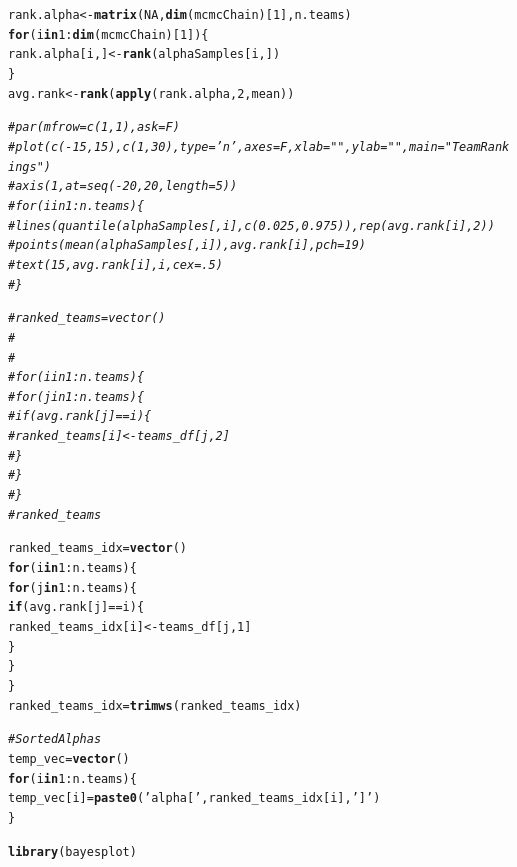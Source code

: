 \documentclass{article}\usepackage[]{graphicx}\usepackage[]{color}
\makeatletter
\newcommand{\hlnum}[1]{\textcolor[rgb]{0.686,0.059,0.569}{#1}}%
\newcommand{\hlstr}[1]{\textcolor[rgb]{0.192,0.494,0.8}{#1}}%
\newcommand{\hlcom}[1]{\textcolor[rgb]{0.678,0.584,0.686}{\textit{#1}}}%
\newcommand{\hlopt}[1]{\textcolor[rgb]{0,0,0}{#1}}%
\newcommand{\hlstd}[1]{\textcolor[rgb]{0.345,0.345,0.345}{#1}}%
\newcommand{\hlkwa}[1]{\textcolor[rgb]{0.161,0.373,0.58}{\textbf{#1}}}%
\newcommand{\hlkwb}[1]{\textcolor[rgb]{0.69,0.353,0.396}{#1}}%
\newcommand{\hlkwd}[1]{\textcolor[rgb]{0.737,0.353,0.396}{\textbf{#1}}}%
\newenvironment{kframe}{%
 \def\at@end@of@kframe{}%
 \ifinner\ifhmode%
  \def\at@end@of@kframe{\end{minipage}}%
  \begin{minipage}{\columnwidth}%
 \fi\fi%
 \def\FrameCommand##1{\hskip\@totalleftmargin \hskip-\fboxsep
 \colorbox{shadecolor}{##1}\hskip-\fboxsep
     \hskip-\linewidth \hskip-\@totalleftmargin \hskip\columnwidth}%
 \MakeFramed {\advance\hsize-\width
   \@totalleftmargin\z@ \linewidth\hsize
   \@setminipage}}%
 {\par\unskip\endMakeFramed%
 \at@end@of@kframe}
\newenvironment{knitrout}{}{} %
\makeatother
\begin{document}
\begin{knitrout}
\begin{kframe}
\begin{alltt}
\hlstd{rank.alpha} \hlkwb{<-} \hlkwd{matrix}\hlstd{(}\hlnum{NA}\hlstd{,} \hlkwd{dim}\hlstd{(mcmcChain)[}\hlnum{1}\hlstd{], n.teams)}
\hlkwa{for}\hlstd{(i} \hlkwa{in} \hlnum{1}\hlopt{:}\hlkwd{dim}\hlstd{(mcmcChain)[}\hlnum{1}\hlstd{])\{}
  \hlstd{rank.alpha[i,]} \hlkwb{<-} \hlkwd{rank}\hlstd{(alphaSamples[i,])}
\hlstd{\}}
\hlstd{avg.rank} \hlkwb{<-} \hlkwd{rank}\hlstd{(}\hlkwd{apply}\hlstd{(rank.alpha,} \hlnum{2}\hlstd{, mean))}


\hlcom{# par(mfrow=c(1,1), ask=F)}
\hlcom{# plot(c(-15,15), c(1,30), type='n', axes=F, xlab="", ylab="", main="Team Rankings")}
\hlcom{# axis(1,at=seq(-20, 20, length=5))}
\hlcom{# for(i in 1:n.teams)\{}
\hlcom{#   lines(quantile(alphaSamples[,i], c(0.025,0.975)), rep(avg.rank[i],2))}
\hlcom{#   points(mean(alphaSamples[,i]), avg.rank[i], pch=19)}
\hlcom{#   text(15, avg.rank[i], i, cex=.5)}
\hlcom{# \}}

\hlcom{# ranked_teams = vector()}
\hlcom{# }
\hlcom{# }
\hlcom{# for(i in 1:n.teams)\{}
\hlcom{#   for(j in 1:n.teams)\{}
\hlcom{#     if (avg.rank[j] == i)\{}
\hlcom{#       ranked_teams[i]<- teams_df[j,2]}
\hlcom{#     \}}
\hlcom{#   \}}
\hlcom{# \}}
\hlcom{# ranked_teams}

\hlstd{ranked_teams_idx} \hlkwb{=} \hlkwd{vector}\hlstd{()}
\hlkwa{for}\hlstd{(i} \hlkwa{in} \hlnum{1}\hlopt{:}\hlstd{n.teams)\{}
  \hlkwa{for}\hlstd{(j} \hlkwa{in} \hlnum{1}\hlopt{:}\hlstd{n.teams)\{}
    \hlkwa{if} \hlstd{(avg.rank[j]} \hlopt{==} \hlstd{i)\{}
      \hlstd{ranked_teams_idx[i]}\hlkwb{<-} \hlstd{teams_df[j,}\hlnum{1}\hlstd{]}
    \hlstd{\}}
  \hlstd{\}}
\hlstd{\}}
\hlstd{ranked_teams_idx} \hlkwb{=} \hlkwd{trimws}\hlstd{(ranked_teams_idx)}

\hlcom{# Sorted Alphas}
\hlstd{temp_vec}\hlkwb{=}\hlkwd{vector}\hlstd{()}
\hlkwa{for}\hlstd{(i} \hlkwa{in} \hlnum{1}\hlopt{:}\hlstd{n.teams)\{}
  \hlstd{temp_vec[i]} \hlkwb{=} \hlkwd{paste0}\hlstd{(}\hlstr{'alpha['}\hlstd{,ranked_teams_idx[i],}\hlstr{']'}\hlstd{)}
\hlstd{\}}

\hlkwd{library}\hlstd{(bayesplot)}


\end{alltt}
\end{kframe}
\end{knitrout}
\end{document}
